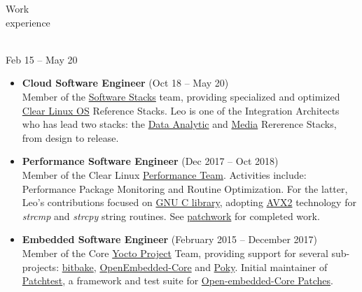 \documentclass{resume}
\def\intel{Intel Corporation}
\def\cl{Clear Linux OS}
\begin{document}
\begin{category}{Work \\experience}

\citem{\intel}\\
Feb 15 -- May 20
\begin{itemize}
\item \textbf{Cloud Software Engineer} (Oct 18 -- May 20)\\
  Member of the \href{https://github.com/intel/stacks}{Software Stacks} team,
  providing specialized and optimized \href{https://clearlinux.org/}{\cl} Reference Stacks.
  Leo is one of the Integration Architects who has lead two stacks:
  the \href{https://github.com/intel/stacks/blob/master/dars/dars.rst}{Data Analytic}
  and \href{https://github.com/intel/stacks/blob/master/mers/README.md}{Media} Rererence Stacks,
  from design to release.
\end{itemize}

\begin{itemize}
\item \textbf{Performance Software Engineer} (Dec 2017 -- Oct 2018)\\
  Member of the Clear Linux \href{https://clearlinux.org/}{Performance Team}.
  Activities include: Performance Package Monitoring and Routine Optimization.
  For the latter, Leo's contributions focused on
  \href{https://www.gnu.org/software/libc/}{GNU C library},
  adopting \href{}{AVX2} technology for \textit{strcmp} and \textit{strcpy} string routines.
  See \href{https://patchwork.ozlabs.org/project/glibc/list/?submitter=74072}{patchwork}
  for completed work.
\end{itemize}

\begin{itemize}
\item \textbf{Embedded Software Engineer} (February 2015 -- December 2017)\\
  Member of the Core \href{https://www.yoctoproject.org/}{Yocto Project} Team,
  providing support for several sub-projects:
  \href{https://lists.openembedded.org/g/bitbake-devel/search?p=recentpostdate%252Fsticky%2C%2C%2C20%2C2%2C0%2C0&q=Leonardo+Sandoval}{bitbake},
  \href{https://lists.openembedded.org/g/openembedded-core/search?p=recentpostdate%252Fsticky%2C%2C%2C20%2C2%2C0%2C0&q=Leonardo+Sandoval}{OpenEmbedded-Core} and
    \href{https://lists.yoctoproject.org/g/poky/search?p=created%2C0%2C%2C1%2C2%2C0%2C0&q=Leonardo+Sandoval}{Poky}. Initial maintainer of
      \href{http://git.yoctoproject.org/cgit/cgit.cgi/patchtest/}{Patchtest},
    a framework and test suite for \href{https://patchwork.openembedded.org/project/oe-core/series/?ordering=-last_updated}{Open-embedded-Core Patches}.
\end{itemize}


\end{category}
\end{document}
